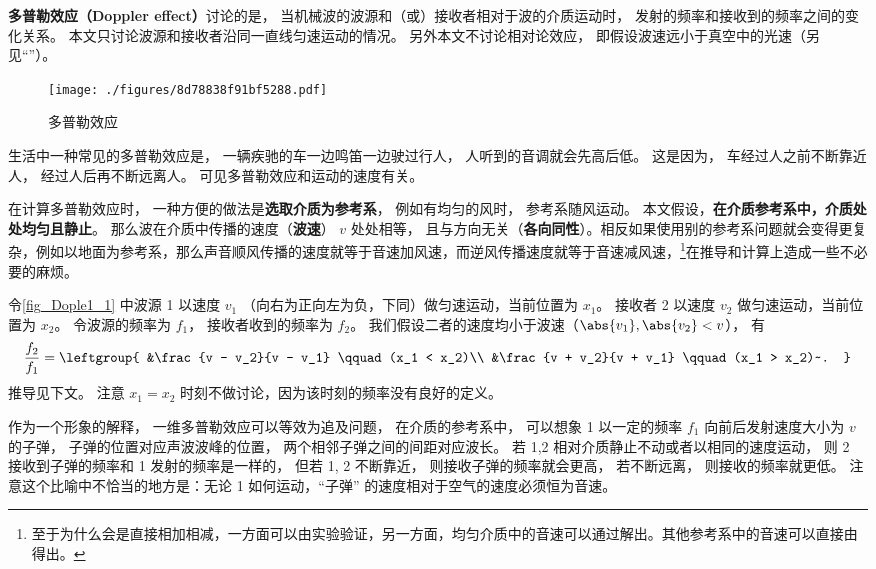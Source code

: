 

\textbf{多普勒效应（Doppler effect）}讨论的是， 当机械波的波源和（或）接收者相对于波的介质运动时， 发射的频率和接收到的频率之间的变化关系。 本文只讨论波源和接收者沿同一直线匀速运动的情况。 另外本文不讨论相对论效应， 即假设波速远小于真空中的光速（另见“”）。

\begin{figure}[ht]
\centering
\texttt{[image: ./figures/8d78838f91bf5288.pdf]}
\caption{多普勒效应} \label{fig_Dople1_1}
\end{figure}

\begin{example}{}
生活中一种常见的多普勒效应是， 一辆疾驰的车一边鸣笛一边驶过行人， 人听到的音调就会先高后低。 这是因为， 车经过人之前不断靠近人， 经过人后再不断远离人。 可见多普勒效应和运动的速度有关。
\end{example}

在计算多普勒效应时， 一种方便的做法是\textbf{选取介质为参考系}， 例如有均匀的风时， 参考系随风运动。 本文假设，\textbf{在介质参考系中，介质处处均匀且静止}。 那么波在介质中传播的速度（\textbf{波速}） $v$ 处处相等， 且与方向无关（\textbf{各向同性}）。相反如果使用别的参考系问题就会变得更复杂，例如以地面为参考系，那么声音顺风传播的速度就等于音速加风速，而逆风传播速度就等于音速减风速，\footnote{至于为什么会是直接相加相减，一方面可以由实验验证，另一方面，均匀介质中的音速可以通过解出。其他参考系中的音速可以直接由得出。}在推导和计算上造成一些不必要的麻烦。

令\autoref{fig_Dople1_1} 中波源 1 以速度 $v_1$ （向右为正向左为负，下同）做匀速运动，当前位置为 $x_1$。 接收者 2 以速度 $v_2$ 做匀速运动，当前位置为 $x_2$。 令波源的频率为 $f_1$， 接收者收到的频率为 $f_2$。 我们假设二者的速度均小于波速（$\abs{v_1}, \abs{v_2} < v$）， 有
\begin{equation}\label{eq_Dople1_1}
\frac{f_2}{f_1} = \leftgroup{
&\frac{v - v_2}{v - v_1} \qquad (x_1 < x_2)\\
&\frac{v + v_2}{v + v_1} \qquad (x_1 > x_2)~.
}\end{equation}
推导见下文。 注意 $x_1=x_2$ 时刻不做讨论，因为该时刻的频率没有良好的定义。

作为一个形象的解释， 一维多普勒效应可以等效为追及问题， 在介质的参考系中， 可以想象 1 以一定的频率 $f_1$ 向前后发射速度大小为 $v$ 的子弹， 子弹的位置对应声波波峰的位置， 两个相邻子弹之间的间距对应波长。 若 1,2 相对介质静止不动或者以相同的速度运动， 则 2 接收到子弹的频率和 1 发射的频率是一样的， 但若 1, 2 不断靠近， 则接收子弹的频率就会更高， 若不断远离， 则接收的频率就更低。 注意这个比喻中不恰当的地方是：无论 1 如何运动，“子弹” 的速度相对于空气的速度必须恒为音速。

